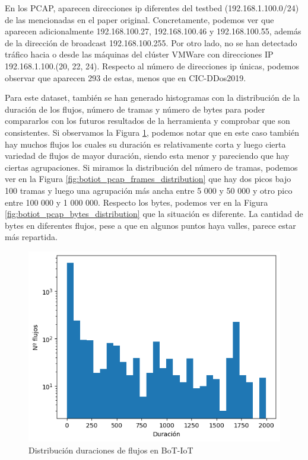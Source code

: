 En los PCAP, aparecen direcciones \acrshort{ip} diferentes del testbed (192.168.1.100.0/24) de las mencionadas en el paper original. Concretamente, podemos ver que aparecen adicionalmente 192.168.100.27, 192.168.100.46 y 192.168.100.55, además de la dirección de broadcast 192.168.100.255. Por otro lado, no se han detectado tráfico hacia o desde las máquinas del clúster VMWare con direcciones IP 192.168.1.100.(20, 22, 24). Respecto al número de direcciones \acrshort{ip} únicas, podemos observar que aparecen 293 de estas, menos que en CIC-DDos2019.

Para este dataset, también se han generado histogramas con la distribución de la duración de los flujos, número de tramas y número de bytes para poder compararlos con los futuros resultados de la herramienta y comprobar que son consistentes. Si observamos la Figura \ref{fig:botiot_pcap_duration_distribution}, podemos notar que en este caso también hay muchos flujos los cuales su duración es relativamente corta y luego cierta variedad de flujos de mayor duración, siendo esta menor y pareciendo que hay ciertas agrupaciones. Si miramos la distribución del número de tramas, podemos ver en la Figura \ref{fig:botiot_pcap_frames_distribution} que hay dos picos bajo 100 tramas y luego una agrupación más ancha entre 5 000 y 50 000 y otro pico entre 100 000 y 1 000 000. Respecto los bytes, podemos ver en la Figura \ref{fig:botiot_pcap_bytes_distribution} que la situación es diferente. La cantidad de bytes en diferentes flujos, pese a que en algunos puntos haya valles, parece estar más repartida.

\begin{figure}[H]
    \begin{center}
        \includegraphics[width=0.40\linewidth]{media/botiot_pcap_duration_distribution.png}
    \end{center}
    \captionsetup{justification=centering}
    \caption{Distribución duraciones de flujos en BoT-IoT}\label{fig:botiot_pcap_duration_distribution}
\end{figure}

